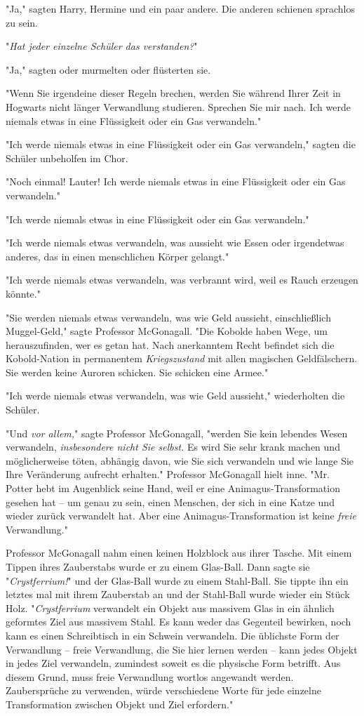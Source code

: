 {"Ja," sagten Harry, Hermine und ein paar andere. Die anderen schienen sprachlos zu sein.

"\emph{Hat jeder einzelne Schüler das verstanden?}"

"Ja," sagten oder murmelten oder flüsterten sie.

"Wenn Sie irgendeine dieser Regeln brechen, werden Sie während Ihrer Zeit in Hogwarts nicht länger Verwandlung studieren. Sprechen Sie mir nach. Ich werde niemals etwas in eine Flüssigkeit oder ein Gas verwandeln."

"Ich werde niemals etwas in eine Flüssigkeit oder ein Gas verwandeln," sagten die Schüler unbeholfen im Chor.

"Noch einmal! Lauter! Ich werde niemals etwas in eine Flüssigkeit oder ein Gas verwandeln."

"Ich werde niemals etwas in eine Flüssigkeit oder ein Gas verwandeln."

"Ich werde niemals etwas verwandeln, was aussieht wie Essen oder irgendetwas anderes, das in einen menschlichen Körper gelangt."

"Ich werde niemals etwas verwandeln, was verbrannt wird, weil es Rauch erzeugen könnte."

"Sie werden niemals etwas verwandeln, was wie Geld aussieht, einschließlich Muggel-Geld," sagte Professor McGonagall. "Die Kobolde haben Wege, um herauszufinden, wer es getan hat. Nach anerkanntem Recht befindet sich die Kobold-Nation in permanentem \emph{Kriegszustand} mit allen magischen Geldfälschern. Sie werden keine Auroren schicken. Sie schicken eine Armee."

"Ich werde niemals etwas verwandeln, was wie Geld aussieht," wiederholten die Schüler.

"Und \emph{vor allem,}" sagte Professor McGonagall, "werden Sie kein lebendes Wesen verwandeln, \emph{insbesondere nicht Sie selbst.} Es wird Sie sehr krank machen und möglicherweise töten, abhängig davon, wie Sie sich verwandeln und wie lange Sie Ihre Veränderung aufrecht erhalten." Professor McGonagall hielt inne. "Mr. Potter hebt im Augenblick seine Hand, weil er eine Animagus-Transformation gesehen hat -- um genau zu sein, einen Menschen, der sich in eine Katze und wieder zurück verwandelt hat. Aber eine Animagus-Transformation ist keine \emph{freie} Verwandlung."

Professor McGonagall nahm einen keinen Holzblock aus ihrer Tasche. Mit einem Tippen ihres Zauberstabs wurde er zu einem Glas-Ball. Dann sagte sie "\emph{Crystferrium!}" und der Glas-Ball wurde zu einem Stahl-Ball. Sie tippte ihn ein letztes mal mit ihrem Zauberstab an und der Stahl-Ball wurde wieder ein Stück Holz. "\emph{Crystferrium} verwandelt ein Objekt aus massivem Glas in ein ähnlich geformtes Ziel aus massivem Stahl. Es kann weder das Gegenteil bewirken, noch kann es einen Schreibtisch in ein Schwein verwandeln. Die üblichste Form der Verwandlung -- freie Verwandlung, die Sie hier lernen werden -- kann jedes Objekt in jedes Ziel verwandeln, zumindest soweit es die physische Form betrifft. Aus diesem Grund, muss freie Verwandlung wortlos angewandt werden. Zaubersprüche zu verwenden, würde verschiedene Worte für jede einzelne Transformation zwischen Objekt und Ziel erfordern."

}
